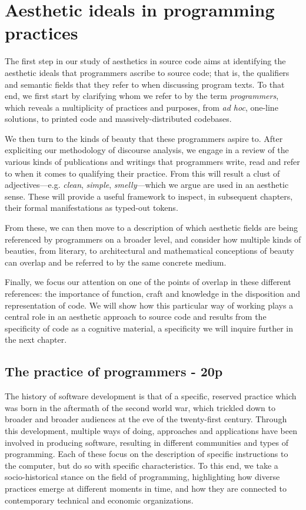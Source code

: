 \chapter{Aesthetic ideals in programming practices}

The first step in our study of aesthetics in source code aims at identifying the aesthetic ideals that programmers ascribe to source code; that is, the qualifiers and semantic fields that they refer to when discussing program texts. To that end, we first start by clarifying whom we refer to by the term \emph{programmers}, which reveals a multiplicity of practices and purposes, from \emph{ad hoc}, one-line solutions, to printed code and massively-distributed codebases.

We then turn to the kinds of beauty that these programmers aspire to. After expliciting our methodology of discourse analysis, we engage in a review of the various kinds of publications and writings that programmers write, read and refer to when it comes to qualifying their practice. From this will result a clust of adjectives—e.g. \emph{clean}, \emph{simple}, \emph{smelly}—which we argue are used in an aesthetic sense. These will provide a useful framework to inspect, in subsequent chapters, their formal manifestations as typed-out tokens.

From these, we can then move to a description of which aesthetic fields are being referenced by programmers on a broader level, and consider how multiple kinds of beauties, from literary, to architectural and mathematical conceptions of beauty can overlap and be referred to by the same concrete medium.

Finally, we focus our attention on one of the points of overlap in these different references: the importance of function, craft and knowledge in the disposition and representation of code. We will show how this particular way of working  plays a central role in an aesthetic approach to source code and results from the specificity of code as a cognitive material, a specificity we will inquire further in the next chapter.

\section{The practice of programmers - 20p}

The history of software development is that of a specific, reserved practice which was born in the aftermath of the second world war, which trickled down to broader and broader audiences at the eve of the twenty-first century. Through this development, multiple ways of doing, approaches and applications have been involved in producing software, resulting in different communities and types of programming. Each of these focus on the description of specific instructions to the computer, but do so with specific characteristics. To this end, we take a socio-historical stance on the field of programming, highlighting how diverse practices emerge at different moments in time, and how they are connected to contemporary technical and economic organizations.

